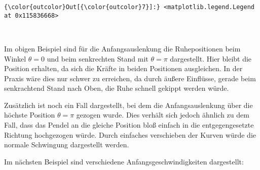\documentclass[11pt]{article}
\begin{document}
\begin{Verbatim}[commandchars=\\\{\}]
{\color{outcolor}Out[{\color{outcolor}7}]:} <matplotlib.legend.Legend at 0x115836668>
\end{Verbatim}
            
    \begin{center}
    \end{center}
    { \hspace*{\fill} \\}
    
    Im obigen Beispiel sind für die Anfangsauslenkung die Ruhepositionen
beim Winkel \(\theta=0\) und beim senkrechten Stand mit \(\theta=\pi\)
dargestellt. Hier bleibt die Position erhalten, da sich die Kräfte in
beiden Positionen ausgleichen. In der Praxis wäre dies nur schwer zu
erreichen, da durch äußere Einflüsse, gerade beim senkrachtend Stand
nach Oben, die Ruhe schnell gekippt werden würde.

Zusätzlich ist noch ein Fall dargestellt, bei dem die Anfangsauslenkung
über die höchste Position \(\theta=\pi\) gezogen wurde. Dies verhält
sich jedoch ähnlich zu dem Fall, dass das Pendel an die gleiche Position
bloß einfach in die entgegengesetzte Richtung hochgezogen würde. Durch
einfaches verschieben der Kurven würde die normale Schwingung
dargestellt werden.

Im nächsten Beispiel sind verschiedene Anfangsgeschwindigkeiten
dargestellt:
\end{document}
